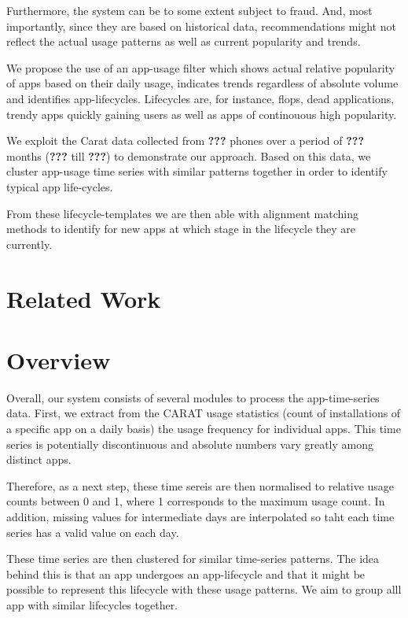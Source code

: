 \documentclass{sigchi}
\begin{document}
Furthermore, the system can be to some extent subject to fraud. 
And, most importantly, since they are based on historical data, recommendations might not reflect the actual usage patterns as well as current popularity and trends.

We propose the use of an app-usage filter which shows actual relative popularity of apps based on their daily usage, indicates trends regardless of absolute volume and identifies app-lifecycles. 
Lifecycles are, for instance, flops, dead applications, trendy apps quickly gaining users as well as apps of continouous high popularity. 

We exploit the Carat data \textbf{\cite{???}} collected from \textbf{???} phones over a period of \textbf{???} months (\textbf{???} till \textbf{???}) to demonstrate our approach.
Based on this data, we cluster app-usage time series with similar patterns together in order to identify typical app life-cycles.

From these lifecycle-templates we are then able with alignment matching methods to identify for new apps at which stage in the lifecycle they are currently.

\section{Related Work}


\section{Overview}
Overall, our system consists of several modules to process the app-time-series data. 
First, we extract from the CARAT usage statistics (count of installations of a specific app on a daily basis) the usage frequency for individual apps.
This time series is potentially discontinuous and absolute numbers vary greatly among distinct apps.

Therefore, as a next step, these time sereis are then normalised to relative usage counts between 0 and 1, where 1 corresponds to the maximum usage count. 
In addition, missing values for intermediate days are interpolated so taht each time series has a valid value on each day.

These time series are then clustered for similar time-series patterns.
The idea behind this is that an app undergoes an app-lifecycle and that it might be possible to represent this lifecycle with these usage patterns.
We aim to group alll app with similar lifecycles together.
\end{document}
